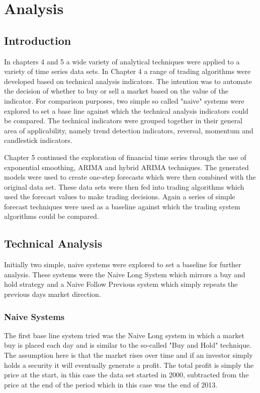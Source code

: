 
\chapter{Analysis} %

\label{Chapter6} %



\section{Introduction}
In chapters 4 and 5 a wide variety of analytical techniques were applied to a variety of time series data sets. In Chapter 4 a range of trading algorithms were developed based on technical analysis indicators.  The intention was to automate the decision of whether to buy or sell a market based on the value of the indicator. For comparison purposes, two simple so called "naive" systems were explored to set a base line against which the technical analysis indicators could be compared.  The technical indicators were grouped together in their general area of applicability, namely trend detection indicators, reversal, momentum and candlestick indicators.

Chapter 5 continued the exploration of financial time series through the use of exponential smoothing, ARIMA and hybrid ARIMA techniques. The generated models were used to create one-step forecasts which were then combined with the original data set. These data sets were then fed into trading algorithms which used the forecast values to make trading decisions. Again a series of simple forecast techniques were used as a baseline against which the trading system algorithms could be compared.

\section{Technical Analysis}
Initially two simple, naive systems were explored to set a baseline for further analysis. These systems were the Naive Long System which mirrors a buy and hold strategy and a Naive Follow Previous system which simply repeats the previous days market direction.

\subsection{Naive Systems}
The first base line system tried was the Naive Long system in which a market buy is placed each day and is similar to the so-called "Buy and Hold" technique. The assumption here is that the market rises over time and if an investor simply holds a security it will eventually generate a profit.  The total profit is simply the price at the start, in this case the data set started in 2000, subtracted from the price at the end of the period which in this case was the end of 2013.

